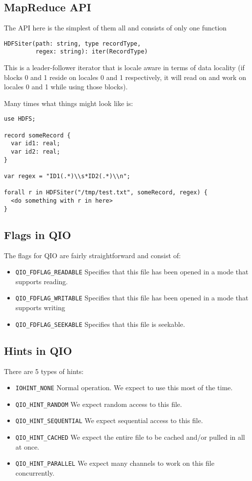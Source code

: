 \subsection{MapReduce API}
The API here is the simplest of them all and consists of only one function
\begin{lstlisting}
HDFSiter(path: string, type recordType,
         regex: string): iter(RecordType)
\end{lstlisting}
This is a leader-follower iterator that is locale aware in terms of data
locality (\eg  if blocks 0 and 1 reside on locales 0 and 1 respectively,
it will read on and work on locales 0 and 1 while using those blocks).

Many times what things might look like is:
\begin{lstlisting}
use HDFS;

record someRecord {
  var id1: real;
  var id2: real;
}

var regex = "ID1(.*)\\s*ID2(.*)\\n";

forall r in HDFSiter("/tmp/test.txt", someRecord, regex) {
  <do something with r in here>
}
\end{lstlisting}

\subsection{Flags in QIO}\label{s:flags}
The flags for QIO are fairly straightforward and consist of:
\begin{itemize}
\item {\tt QIO\_FDFLAG\_READABLE} Specifies that this file has been opened in a mode that
supports reading. 
\item {\tt QIO\_FDFLAG\_WRITABLE} Specifies that this file has been opened in a mode that
supports writing
\item {\tt QIO\_FDFLAG\_SEEKABLE} Specifies that this file is seekable.
\end{itemize}

\subsection{Hints in QIO}\label{s:hints}
There are 5 types of hints:
\begin{itemize}
\item {\tt IOHINT\_NONE} Normal operation. We expect to use this most of the time.
\item {\tt QIO\_HINT\_RANDOM} We expect random access to this file.
\item {\tt QIO\_HINT\_SEQUENTIAL} We expect sequential access to this file.
\item {\tt QIO\_HINT\_CACHED} We expect the entire file to be cached and/or pulled in all
at once.
\item {\tt QIO\_HINT\_PARALLEL} We expect many channels to work on this file concurrently.
\end{itemize}

